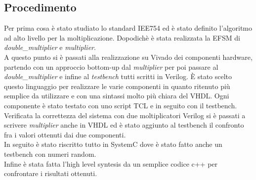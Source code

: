 \documentclass[]{IEEEtran}
\begin{document}
\subsection{Procedimento}
Per prima cosa è stato studiato lo standard IEE754 ed è stato definito l'algoritmo ad alto livello per la moltiplicazione. Dopodichè è stata realizzata la EFSM di \textit{double\_multiplier} e \textit{multiplier}.
\\A questo punto si è passati alla realizzazione su Vivado\cite{Vivado} dei componenti hardware, partendo con un approccio bottom-up dal \textit{multiplier} per poi passare al \textit{double\_multiplier} e infine al \textit{testbench} tutti scritti in Verilog. È stato scelto questo linguaggio per realizzare le varie componenti in quanto ritenuto più semplice da utilizzare e con una sintassi molto più chiara del VHDL. Ogni componente è stato testato con uno script TCL e in seguito con il testbench. Verificata la correttezza del sistema con due moltiplicatori Verilog si è passati a scrivere \textit{multiplier} anche in VHDL ed è stato aggiunto al testbench il confronto fra i valori ottenuti dai due componenti.
\\In seguito è stato riscritto tutto in SystemC dove è stato fatto anche un testbench con numeri random.
\\Infine è stata fatta l'high level syntesis da un semplice codice c++ per confrontare i risultati ottenuti.
\end{document}
